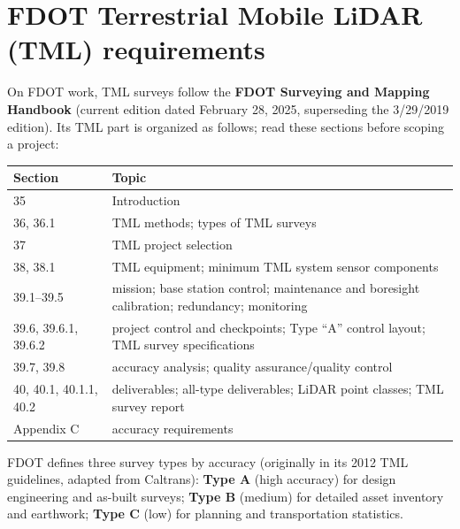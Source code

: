 \section{FDOT Terrestrial Mobile LiDAR (TML) requirements}
\begin{eng}
On FDOT work, TML surveys follow the \textbf{FDOT Surveying and Mapping Handbook} (current edition dated February 28, 2025, superseding the 3/29/2019 edition). Its TML part is organized as follows; read these sections before scoping a project:
\begin{center}\small
\renewcommand{\arraystretch}{1.15}
\begin{tabularx}{\linewidth}{p{3.2cm}X}\toprule
\textbf{Section} & \textbf{Topic}\\\midrule
35 & Introduction\\
36, 36.1 & TML methods; types of TML surveys\\
37 & TML project selection\\
38, 38.1 & TML equipment; minimum TML system sensor components\\
39.1--39.5 & mission; base station control; maintenance and boresight calibration; redundancy; monitoring\\
39.6, 39.6.1, 39.6.2 & project control and checkpoints; Type ``A'' control layout; TML survey specifications\\
39.7, 39.8 & accuracy analysis; quality assurance/quality control\\
40, 40.1, 40.1.1, 40.2 & deliverables; all-type deliverables; LiDAR point classes; TML survey report\\
Appendix C & accuracy requirements\\\bottomrule
\end{tabularx}\end{center}
FDOT defines three survey types by accuracy (originally in its 2012 TML guidelines, adapted from Caltrans): \textbf{Type A} (high accuracy) for design engineering and as-built surveys; \textbf{Type B} (medium) for detailed asset inventory and earthwork; \textbf{Type C} (low) for planning and transportation statistics.
\end{eng}


